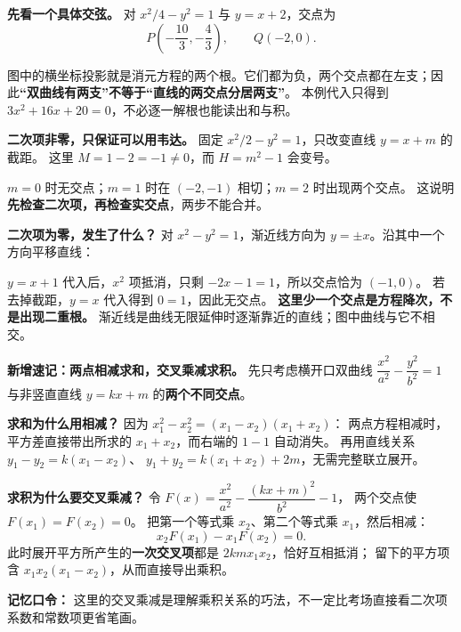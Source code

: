 \begin{explanationbox}
\textbf{先看一个具体交弦。} 对 $x^2/4-y^2=1$ 与 $y=x+2$，交点为
\[
 P\left(-\frac{10}{3},-\frac43\right),\qquad Q(-2,0).
\]

图中的横坐标投影就是消元方程的两个根。它们都为负，两个交点都在左支；因此\textbf{“双曲线有两支”不等于“直线的两交点分居两支”}。
本例代入只得到 $3x^2+16x+20=0$，不必逐一解根也能读出和与积。
\end{explanationbox}
\clearpage
\begin{explanationbox}
\textbf{二次项非零，只保证可以用韦达。}
固定 $x^2/2-y^2=1$，只改变直线 $y=x+m$ 的截距。
这里 $M=1-2=-1\ne0$，而 $H=m^2-1$ 会变号。

$m=0$ 时无交点；$m=1$ 时在 $(-2,-1)$ 相切；$m=2$ 时出现两个交点。
这说明\textbf{先检查二次项，再检查实交点}，两步不能合并。
\end{explanationbox}
\clearpage
\begin{explanationbox}
\textbf{二次项为零，发生了什么？}
对 $x^2-y^2=1$，渐近线方向为 $y=\pm x$。沿其中一个方向平移直线：

$y=x+1$ 代入后，$x^2$ 项抵消，只剩 $-2x-1=1$，所以交点恰为 $(-1,0)$。
若去掉截距，$y=x$ 代入得到 $0=1$，因此无交点。
\textbf{这里少一个交点是方程降次，不是出现二重根。}
渐近线是曲线无限延伸时逐渐靠近的直线；图中曲线与它不相交。
\end{explanationbox}
\clearpage
\begin{explanationbox}
\textbf{新增速记：两点相减求和，交叉乘减求积。}
先只考虑横开口双曲线
$\dfrac{x^2}{a^2}-\dfrac{y^2}{b^2}=1$ 与非竖直直线 $y=kx+m$ 的\textbf{两个不同交点}。

\textbf{求和为什么用相减？} 因为 $x_1^2-x_2^2=(x_1-x_2)(x_1+x_2)$：
两点方程相减时，平方差直接带出所求的 $x_1+x_2$，而右端的 $1-1$ 自动消失。
再用直线关系 $y_1-y_2=k(x_1-x_2)$、
$y_1+y_2=k(x_1+x_2)+2m$，无需完整联立展开。

\textbf{求积为什么要交叉乘减？} 令
$F(x)=\dfrac{x^2}{a^2}-\dfrac{(kx+m)^2}{b^2}-1$，
两个交点使 $F(x_1)=F(x_2)=0$。
把第一个等式乘 $x_2$、第二个等式乘 $x_1$，然后相减：
\[
 x_2F(x_1)-x_1F(x_2)=0.
\]
此时展开平方所产生的\textbf{一次交叉项}都是 $2kmx_1x_2$，恰好互相抵消；
留下的平方项含 $x_1x_2(x_1-x_2)$，从而直接导出乘积。

\textbf{记忆口令：} 
这里的交叉乘减是理解乘积关系的巧法，不一定比考场直接看二次项系数和常数项更省笔画。
\end{explanationbox}
\clearpage

